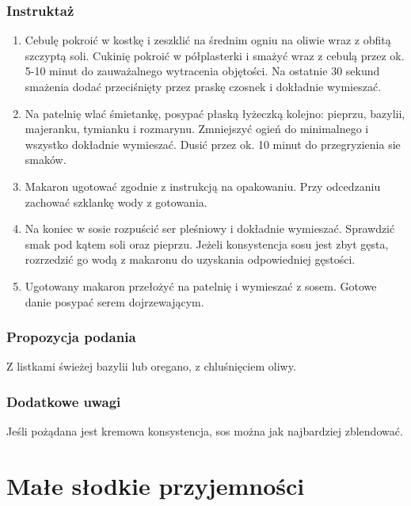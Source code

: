 \documentclass[a4paper,10pt]{book}
\begin{document}
\subsection*{Instruktaż}
\begin{enumerate}
    \item Cebulę pokroić w kostkę i zeszklić na średnim ogniu na oliwie wraz z obfitą szczyptą soli. Cukinię pokroić w półplasterki i smażyć wraz z cebulą przez ok. 5-10 minut do zauważalnego wytracenia objętości. Na ostatnie 30 sekund smażenia dodać przeciśnięty przez praskę czosnek i dokładnie wymieszać.
    \item Na patelnię wlać śmietankę, posypać płaską łyżeczką kolejno: pieprzu, bazylii, majeranku, tymianku i rozmarynu. Zmniejszyć ogień do minimalnego i wszystko dokładnie wymieszać. Dusić przez ok. 10 minut do przegryzienia sie smaków.
    \item Makaron ugotować zgodnie z instrukcją na opakowaniu. Przy odcedzaniu zachować szklankę wody z gotowania.
    \item Na koniec w sosie rozpuścić ser pleśniowy i dokładnie wymieszać. Sprawdzić smak pod kątem soli oraz pieprzu. Jeżeli konsystencja sosu jest zbyt gęsta, rozrzedzić go wodą z makaronu do uzyskania odpowiedniej gęstości. 
    \item Ugotowany makaron przełożyć na patelnię i wymieszać z sosem. Gotowe danie posypać serem dojrzewającym.
\end{enumerate}

\vspace{0.5cm} 

\small
\subsection*{Propozycja podania}
Z listkami świeżej bazylii lub oregano, z chluśnięciem oliwy.

\vspace{0.3cm}

\subsection*{Dodatkowe uwagi}
Jeśli pożądana jest kremowa konsystencja, sos można jak najbardziej zblendować.


\chapter{Małe słodkie przyjemności}
\end{document}
